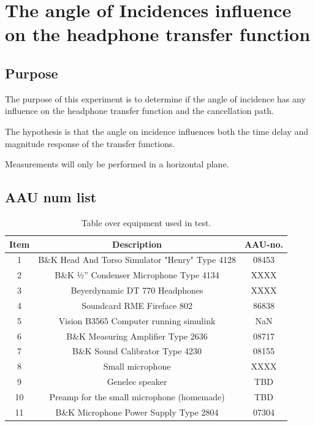 
\section{The angle of Incidences influence on the headphone transfer function}

\subsection{Purpose}
The purpose of this experiment is to determine if the angle of incidence has any influence on the headphone transfer function and the cancellation path. 

The hypothesis is that the angle on incidence influences both the time delay and magnitude response of the transfer functions.

Measurements will only be performed in a horizontal plane. 

\subsection{AAU num list}
\begin{table}[H]
	\centering
	\begin{tabular}{ c c c } \toprule
		{Item}	& {Description} 						& {AAU-no}. \\ \bottomrule 
		1	&	B\&K Head And Torso Simulator "Henry" Type 4128	& 08453	\\
		2	&	B\&K ½'' Condenser Microphone Type 4134 	& XXXX		\\
		3	&	Beyerdynamic DT 770 Headphones				& XXXX		\\
		4	&	Soundcard RME Fireface 802					& 86838		\\
		5	&	Vision B3565 Computer running simulink		& NaN		\\
		6	&	B\&K Measuring Amplifier Type 2636			& 08717		\\
		7	&	B\&K Sound Calibrator Type 4230				& 08155		\\ 
		8	&	Small microphone							& XXXX		\\
		9	&	Genelec speaker								& TBD		\\ 
		10	&	Preamp for the small microphone	(homemade)	& TBD\\
		11	& 	B\&K Microphone Power Supply Type 2804		& 07304		\\
		\bottomrule
	\end{tabular}
	\caption{Table over equipment used in test.}
	\label{tab:AngleOfIncideceHP}
\end{table}

